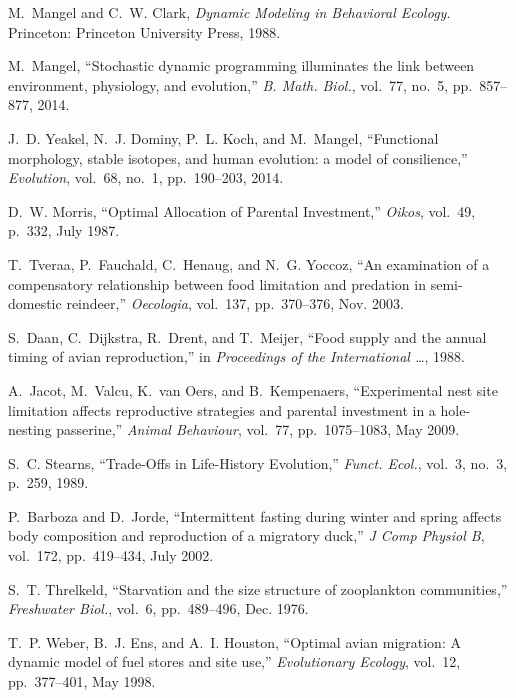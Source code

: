 \documentclass[11pt]{article}
\begin{document}
\begin{multicols}{2}
{\begin{thebibliography}{10}
M.~Mangel and C.~W. Clark, {\em {Dynamic Modeling in Behavioral Ecology}}.
\newblock Princeton: Princeton University Press, 1988.

M.~Mangel, ``{Stochastic dynamic programming illuminates the link between
  environment, physiology, and evolution},'' {\em B. Math. Biol.}, vol.~77,
  no.~5, pp.~857--877, 2014.

J.~D. Yeakel, N.~J. Dominy, P.~L. Koch, and M.~Mangel, ``{Functional
  morphology, stable isotopes, and human evolution: a model of consilience},''
  {\em Evolution}, vol.~68, no.~1, pp.~190--203, 2014.

D.~W. Morris, ``{Optimal Allocation of Parental Investment},'' {\em Oikos},
  vol.~49, p.~332, July 1987.

T.~Tveraa, P.~Fauchald, C.~Henaug, and N.~G. Yoccoz, ``{An examination of a
  compensatory relationship between food limitation and predation in
  semi-domestic reindeer},'' {\em Oecologia}, vol.~137, pp.~370--376, Nov.
  2003.

S.~Daan, C.~Dijkstra, R.~Drent, and T.~Meijer, ``{Food supply and the annual
  timing of avian reproduction},'' in {\em Proceedings of the International
  {\ldots}}, 1988.

A.~Jacot, M.~Valcu, K.~van Oers, and B.~Kempenaers, ``{Experimental nest site
  limitation affects reproductive strategies and parental investment in a
  hole-nesting passerine},'' {\em Animal Behaviour}, vol.~77, pp.~1075--1083,
  May 2009.

S.~C. Stearns, ``{Trade-Offs in Life-History Evolution},'' {\em Funct. Ecol.},
  vol.~3, no.~3, p.~259, 1989.

P.~Barboza and D.~Jorde, ``{Intermittent fasting during winter and spring
  affects body composition and reproduction of a migratory duck},'' {\em J Comp
  Physiol B}, vol.~172, pp.~419--434, July 2002.

S.~T. Threlkeld, ``{Starvation and the size structure of zooplankton
  communities},'' {\em Freshwater Biol.}, vol.~6, pp.~489--496, Dec. 1976.

T.~P. Weber, B.~J. Ens, and A.~I. Houston, ``{Optimal avian migration: A
  dynamic model of fuel stores and site use},'' {\em Evolutionary Ecology},
  vol.~12, pp.~377--401, May 1998.


\end{thebibliography}}
\end{multicols}
\end{document}
